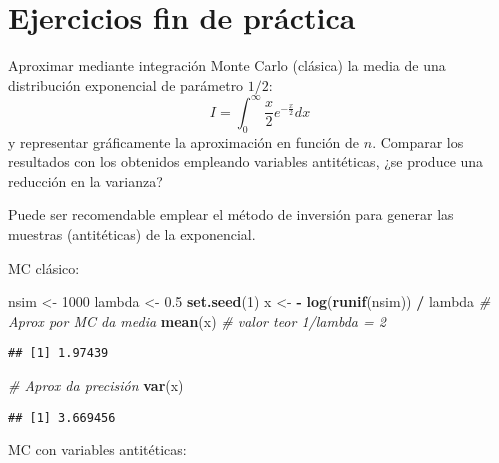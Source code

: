 \documentclass[
]{book}
\newenvironment{Shaded}{\begin{snugshade}}{\end{snugshade}}
\newcommand{\CommentTok}[1]{\textcolor[rgb]{0.56,0.35,0.01}{\textit{#1}}}
\newcommand{\DecValTok}[1]{\textcolor[rgb]{0.00,0.00,0.81}{#1}}
\newcommand{\FloatTok}[1]{\textcolor[rgb]{0.00,0.00,0.81}{#1}}
\newcommand{\KeywordTok}[1]{\textcolor[rgb]{0.13,0.29,0.53}{\textbf{#1}}}
\newcommand{\NormalTok}[1]{#1}
\newcommand{\OperatorTok}[1]{\textcolor[rgb]{0.81,0.36,0.00}{\textbf{#1}}}
\newcommand{\StringTok}[1]{\textcolor[rgb]{0.31,0.60,0.02}{#1}}
\theoremstyle{break}
\theoremstyle{definition}
\theoremstyle{definition}
\theoremstyle{definition}
\theoremstyle{remark}
\let\BeginKnitrBlock\begin \let\EndKnitrBlock\end
\begin{document}
\hypertarget{ejercicios-fin-de-pruxe1ctica}{%
\section{Ejercicios fin de práctica}\label{ejercicios-fin-de-pruxe1ctica}}

\BeginKnitrBlock{exercise}
\protect\hypertarget{exr:unnamed-chunk-20}{}{\label{exr:unnamed-chunk-20} }
\EndKnitrBlock{exercise}

Aproximar mediante integración Monte Carlo (clásica) la media de una
distribución exponencial de parámetro
\(1/2\):\[I=\int_{0}^{\infty}\frac{x}{2}e^{-\frac{x}{2}}dx\]
y representar gráficamente la aproximación en función de \(n\).
Comparar los resultados con los obtenidos empleando variables antitéticas,
¿se produce una reducción en la varianza?

\BeginKnitrBlock{remark}
\iffalse{} {Nota: } \fi{}Puede ser recomendable emplear el método de inversión para generar las
muestras (antitéticas) de la exponencial.
\EndKnitrBlock{remark}

MC clásico:

\begin{Shaded}
\begin{Highlighting}[]
\NormalTok{nsim <-}\StringTok{ }\DecValTok{1000}
\NormalTok{lambda <-}\StringTok{ }\FloatTok{0.5}
\KeywordTok{set.seed}\NormalTok{(}\DecValTok{1}\NormalTok{)}
\NormalTok{x <-}\StringTok{ }\OperatorTok{-}\StringTok{ }\KeywordTok{log}\NormalTok{(}\KeywordTok{runif}\NormalTok{(nsim)) }\OperatorTok{/}\StringTok{ }\NormalTok{lambda}
\CommentTok{# Aprox por MC da media }
\KeywordTok{mean}\NormalTok{(x) }\CommentTok{# valor teor 1/lambda = 2}
\end{Highlighting}
\end{Shaded}

\begin{verbatim}
## [1] 1.97439
\end{verbatim}

\begin{Shaded}
\begin{Highlighting}[]
\CommentTok{# Aprox da precisión }
\KeywordTok{var}\NormalTok{(x)  }
\end{Highlighting}
\end{Shaded}

\begin{verbatim}
## [1] 3.669456
\end{verbatim}

MC con variables antitéticas:
\end{document}

